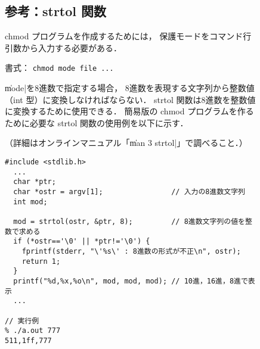 \begin{figure}
\begin{framed}
\subsection*{参考：strtol 関数}
chmod プログラムを作成するためには，
保護モードをコマンド行引数から入力する必要がある．

\centerline{書式： \texttt{chmod mode file ...}}

\|mode|を8進数で指定する場合，
8進数を表現する文字列から整数値（int 型）に変換しなければならない．
strtol 関数は8進数を整数値に変換するために使用できる．
簡易版の chmod プログラムを作るために必要な
strtol 関数の使用例を以下に示す．

（詳細はオンラインマニュアル「\|man 3 strtol|」で調べること．）

\begin{lstlisting}[numbers=none, frame=none]
#include <stdlib.h>
  ...
  char *ptr;
  char *ostr = argv[1];                // 入力の8進数文字列
  int mod;

  mod = strtol(ostr, &ptr, 8);         // 8進数文字列の値を整数で求める
  if (*ostr=='\0' || *ptr!='\0') {
    fprintf(stderr, "\'%s\' : 8進数の形式が不正\n", ostr);
    return 1;
  }
  printf("%d,%x,%o\n", mod, mod, mod); // 10進，16進，8進で表示
  ...

// 実行例
% ./a.out 777
511,1ff,777
\end{lstlisting}
\end{framed}
\end{figure}

%
%
%
%
%
%
%
%
